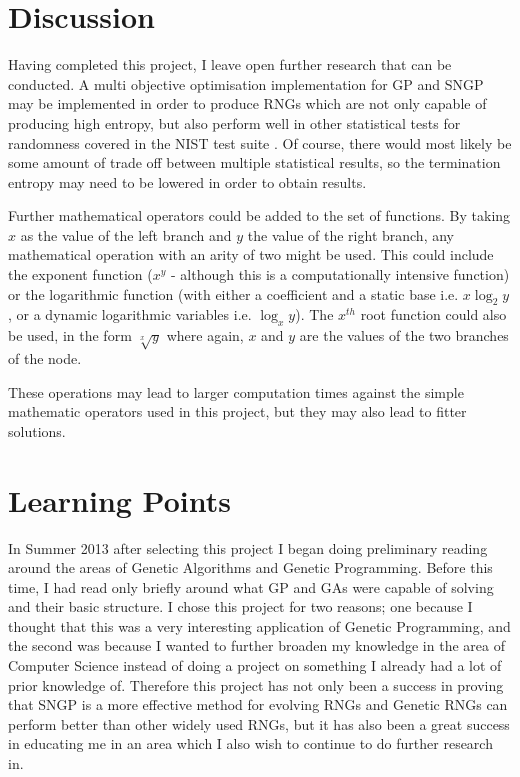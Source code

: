 \documentclass[a4paper,10.5pt]{article}
\begin{document}
\newpage

\section{Discussion}
\label{discussion}
Having completed this project, I leave open further research that can be conducted. A multi objective optimisation implementation for GP and SNGP may be implemented in order to produce RNGs which are not only capable of producing high entropy, but also perform well in other statistical tests for randomness covered in the NIST test suite \cite{nist}. Of course, there would most likely be some amount of trade off between multiple statistical results, so the termination entropy may need to be lowered in order to obtain results. 

Further mathematical operators could be added to the set of functions. By taking $x$ as the value of the left branch and $y$ the value of the right branch, any mathematical operation with an arity of two might be used. This could include the exponent function ($x^y$ - although this is a computationally intensive function) or the logarithmic function (with either a coefficient and a static base i.e. $x \log_2 y$, or a dynamic logarithmic variables i.e. $\log_x y$). The $x^{th}$ root function could also be used, in the form $\sqrt[x]{y}$ where again, $x$ and $y$ are the values of the two branches of the node.

These operations may lead to larger computation times against the simple mathematic operators used in this project, but they may also lead to fitter solutions.

\section{Learning Points}
In Summer 2013 after selecting this project I began doing preliminary reading around the areas of Genetic Algorithms and Genetic Programming. Before this time, I had read only briefly around what GP and GAs were capable of solving and their basic structure. I chose this project for two reasons; one because I thought that this was a very interesting application of Genetic Programming, and the second was because I wanted to further broaden my knowledge in the area of Computer Science instead of doing a project on something I already had a lot of prior knowledge of. Therefore this project has not only been a success in proving that SNGP is a more effective method for evolving RNGs and Genetic RNGs can perform better than other widely used RNGs, but it has also been a great success in educating me in an area which I also wish to continue to do further research in.
\end{document}
